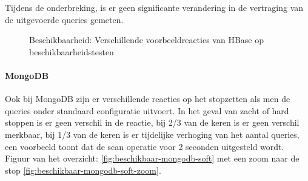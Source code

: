 Tijdens de onderbreking, is er geen significante verandering in de vertraging van de uitgevoerde queries gemeten. 
\begin{figure}[ht!] 
	\centering
	\caption{Beschikbaarheid: Verschillende voorbeeldreacties van HBase op beschikbaarheidstesten }
	\label{fig:beschikbaar-hbase-1}
\end{figure}

\paragraph{MongoDB} \todo{}
Ook bij MongoDB zijn er verschillende reacties op het stopzetten als men de queries onder standaard configuratie uitvoert. In het geval van zacht of hard stoppen is er geen verschil in de reactie, bij 2/3 van de keren is er geen verschil merkbaar, bij 1/3 van de keren is er tijdelijke verhoging van het aantal queries, een voorbeeld toont dat de scan operatie voor 2 seconden uitgesteld wordt. Figuur van het overzicht: \ref{fig:beschikbaar-mongodb-soft} met een zoom naar de stop \ref{fig:beschikbaar-mongodb-soft-zoom}.

